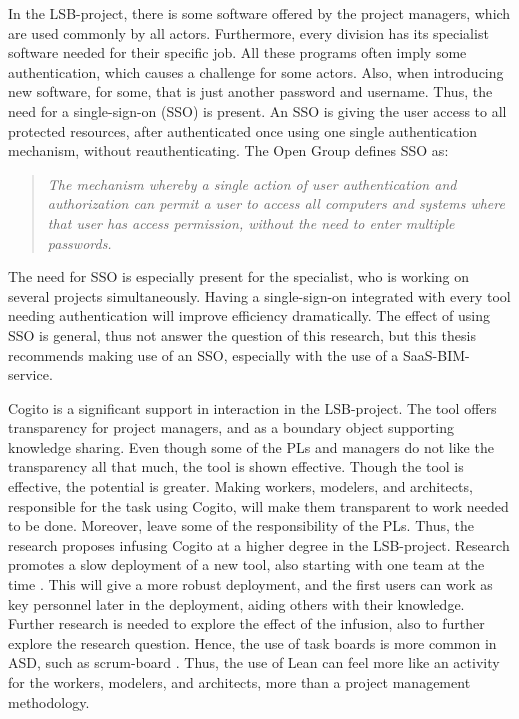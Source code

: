 In the LSB-project, there is some software offered by the project managers, which are used commonly by all actors. Furthermore, every division has its specialist software needed for their specific job. All these programs often imply some authentication, which causes a challenge for some actors. Also, when introducing new software, for some, that is just another password and username. Thus, the need for a single-sign-on (SSO) is present. 
An SSO is giving the user access to all protected resources, after authenticated once using one single authentication mechanism, without reauthenticating. The Open Group \cite{open2019} defines SSO as: 
\begin{quote}
    \textit{The mechanism whereby a single action of user authentication and authorization can permit a user to access all computers and systems where that user has access permission, without the need to enter multiple passwords.}
\end{quote}
The need for SSO is especially present for the specialist, who is working on several projects simultaneously. Having a single-sign-on integrated with every tool needing authentication will improve efficiency dramatically. The effect of using SSO is general, thus not answer the question of this research, but this thesis recommends making use of an SSO, especially with the use of a SaaS-BIM-service. 

Cogito is a significant support in interaction in the LSB-project. The tool offers transparency for project managers, and as a boundary object supporting knowledge sharing. Even though some of the PLs and managers do not like the transparency all that much, the tool is shown effective. Though the tool is effective, the potential is greater. Making workers, modelers, and architects, responsible for the task using Cogito, will make them transparent to work needed to be done.
Moreover, leave some of the responsibility of the PLs. Thus, the research proposes infusing Cogito at a higher degree in the LSB-project. Research promotes a slow deployment of a new tool, also starting with one team at the time \cite{Robey&Sahay}. This will give a more robust deployment, and the first users can work as key personnel later in the deployment, aiding others with their knowledge. Further research is needed to explore the effect of the infusion, also to further explore the research question. Hence, the use of task boards is more common in ASD, such as scrum-board \cite{sutherland}. Thus, the use of Lean can feel more like an activity for the workers, modelers, and architects, more than a project management methodology. 

